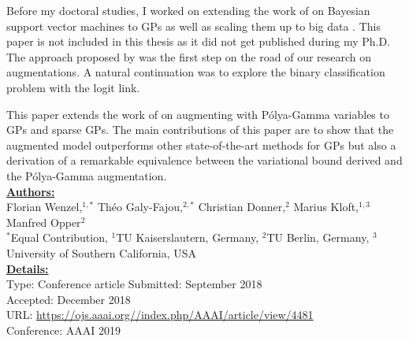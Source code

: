 


\graphicspath{{3/figures/}}

Before my doctoral studies, I worked on extending the work of \citet{henaoBayesianNonlinearSupport2014} on Bayesian support vector machines to \acp{GP} as well as scaling them up to big data \cite{wenzel2017bayesian}.
This paper is not included in this thesis as it did not get published during my Ph.D.
The approach proposed by \citet{henaoBayesianNonlinearSupport2014} was the first step on the road of our research on augmentations.
A natural continuation was to explore the binary classification problem with the logit link.

This paper extends the work of \citet{polsonBayesianInferenceLogistic2012} on augmenting with P\'olya-Gamma variables to \acp{GP} and sparse \acp{GP}.
The main contributions of this paper are to show that the augmented model outperforms other state-of-the-art methods for \acp{GP} but also a derivation of a remarkable equivalence between the variational bound derived \citet{jaakkolaBayesianParameterEstimation2000} and the P\'olya-Gamma augmentation.\\

\textbf{\underline{Authors:}}\\
Florian Wenzel,$^{1,*}$ Th\'eo Galy-Fajou,$^{2,*}$ Christian Donner,$^{2}$ Marius Kloft,$^{1,3}$ Manfred Opper$^2$\\
\small{$^*$Equal Contribution, $^1$TU Kaiserslautern, Germany, $^2$TU Berlin, Germany, $^3$University of Southern California, USA}\\

\textbf{\underline{Details:}}\\
Type: Conference article
Submitted: September 2018\\
Accepted: December 2018\\
URL: \url{https://ojs.aaai.org//index.php/AAAI/article/view/4481}\\
Conference: AAAI 2019\\

